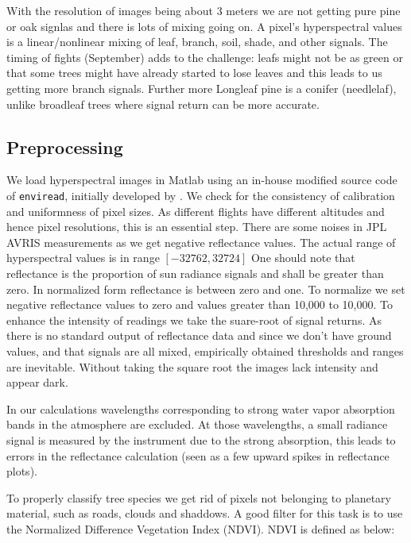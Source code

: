 \documentclass[remotesensing,article,accept,moreauthors,pdftex,12pt,a4paper]{mdpi}
\begin{document}
With the resolution of images being about 3 meters we are not getting pure pine or oak signlas and there is lots of mixing going on. A pixel's hyperspectral values is a linear/nonlinear mixing of leaf, branch, soil, shade, and other signals. The timing of fights (September) adds to the challenge: leafs might not be as green or that some trees might have already started to lose leaves and this leads to us getting more branch signals. Further more Longleaf pine is a conifer (needlelaf), unlike broadleaf trees where signal return can be more accurate. 

\subsection{Preprocessing}

We load hyperspectral images in Matlab using an in-house modified source code of \texttt{enviread}, initially developed by \cite{howat2007enviread}. We check for the consistency of calibration and uniformness of pixel sizes. As different flights have different altitudes and hence pixel resolutions, this is an essential step. There are some noises in JPL AVRIS measurements as we get negative reflectance values. The actual range of hyperspectral values is in range $[-32762, 32724]$ One should note that reflectance is the proportion of sun radiance signals and shall be greater than zero. In normalized form reflectance is between zero and one. To normalize we set negative reflectance values to zero and values greater than 10,000 to 10,000. To enhance the intensity of readings we take the suare-root of signal returns. As there is no standard output of reflectance data and since we don't have ground values, and that signals are all mixed, empirically obtained thresholds and ranges are inevitable. Without taking the square root the images lack intensity and appear dark.


In our calculations wavelengths corresponding to strong water vapor absorption bands in the atmosphere are excluded. At those wavelengths, a small radiance signal is measured by the instrument due to the strong absorption, this leads to errors in the reflectance calculation (seen as a few upward spikes in reflectance plots). 

To properly classify tree species we get rid of pixels not belonging to planetary material, such as roads, clouds and shaddows. A good filter for this task is to use the Normalized Difference Vegetation Index (NDVI). NDVI is defined as below:
\end{document}
